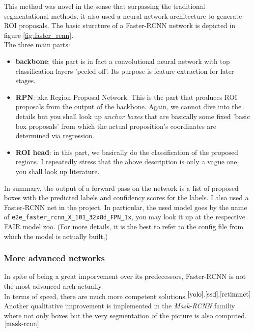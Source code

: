 \documentclass{article}
\begin{document}
This method was novel in the sense that surpassing the traditional segmentational methods, it also used a neural network architecture to generate ROI proposals. The basic sturcture of a Faster-RCNN network is depicted in figure \ref{fig:faster_rcnn}.\\

The three main parts: 

\begin{itemize}
    \item \textbf{backbone}: this part is in fact a convolutional neural network with top classification layers 'peeled off'. Its purpose is feature extraction for later stages.
    
    \item \textbf{RPN}: aka Region Proposal Network. This is the part that produces ROI proposals from the output of the backbone. Again, we cannot dive into the details but you shall look up \textit{anchor boxes} that are basically some fixed 'basic box proposals' from which the actual proposition's coordinates are determined via regression.
    
    \item \textbf{ROI head}: in this part, we basically do the classification of the proposed regions. I repeatedly stress that the above description is only a vague one, you shall look up literature.
\end{itemize}

In summary, the output of a forward pass on the network is a list of proposed boxes with the predicted labels and confidency scores for the labels. I also used a Faster-RCNN net in the project. In particular, the used model goes by the name of \verb|e2e_faster_rcnn_X_101_32x8d_FPN_1x|, you may look it up at the respective FAIR model zoo. (For more details, it is the best to refer to the config file from which the model is actually built.)

\subsubsection{More advanced networks}

In spite of being a great imporvement over its predecessors, Faster-RCNN is not the most advanced arch actually. \\

In terms of speed, there are much more competent solutions.$^{\cite{yolo}, \cite{ssd}, \cite{retinanet}}$\\

Another qualitative improvement is implemented in the \textit{Mask-RCNN} familiy where not only boxes but the very segmentation of the picture is also computed. $^{\cite{mask-rcnn}}$
\end{document}
